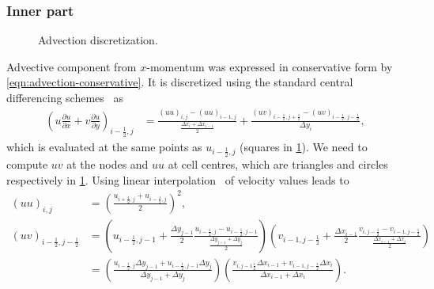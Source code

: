 \documentclass{article}
\numberwithin{equation}{section}
\begin{document}
\subsubsection{Inner part}\label{subsubsec:advection-inner}
\begin{figure}[H] %
  \caption{Advection discretization.}\label{fig:ADV}
\end{figure}
Advective component from $x$-momentum was expressed in conservative form by \cref{eqn:advection-conservative}. It is discretized using the standard central differencing schemes~\cite{Colonius:2008} as
\begin{align}\label{eqn:adv-inner}
	\left (u\frac{\partial u}{\partial x}+v \frac{\partial u}{\partial y}\right)_{i-\frac{1}{2},j}&=\frac{(uu)_{i
	,j}-(uu)_{i- 1,j}}{\frac{\Delta x_i+\Delta x_{i-1}}{2}}+\frac{(uv)_{i-\frac{1}{2},j+\frac{1}{2}}-(uv)_{i-\frac{1}{2},j-\frac{1}{2}}}{\Delta y_i},
\end{align}
which is evaluated at the same points as $u_{i-\frac{1}{2},j}$ (squares in \cref{fig:ADV}). We need to compute $uv$ at the nodes and $uu$ at cell centres, which are triangles and circles respectively in \cref{fig:ADV}. Using linear interpolation~\cite{Colonius:2008} of velocity values leads to
\begin{align*}
  (uu)_{i,j}&=\left(\frac{u_{i+\frac{1}{2},j}+u_{i-\frac{1}{2},j}}{2}\right)^2,\\
  (uv)_{i-\frac{1}{2},j-\frac{1}{2}}&=\left(u_{i-\frac{1}{2},j-1} + \frac{\Delta y_{j-1}}{2}\frac{u_{i-\frac{1}{2},j}-u_{i-\frac{1}{2},j-1}}{\frac{\Delta y_{j-1} +\Delta y_j}{2}} \right) \left( v_{i-1,j-\frac{1}{2}} + \frac{\Delta x_{i-1}}{2}\frac{v_{i,j-\frac{1}{2}}-v_{i-1,j-\frac{1}{2}}}{\frac{\Delta x_{i-1} +\Delta x_i}{2}}\right)\\
  &=\left(\frac{u_{i-\frac{1}{2},j}\Delta y_{j-1} +u_{i-\frac{1}{2},j-1}\Delta y_j}{\Delta y_{j-1}+\Delta y_{j}}\right )\left ( \frac{v_{i,j-1\frac{1}{2}}\Delta x_{i-1} +v_{i-1,j-\frac{1}{2}}\Delta x_i}{\Delta x_{i-1}+\Delta x_{i}}\right).
\end{align*}
\end{document}
